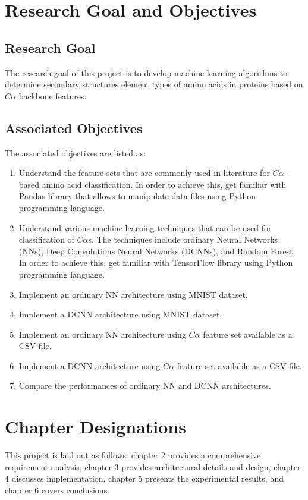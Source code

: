 \documentclass[12pt,letterpaper,oneside,reqno]{book}
\theoremstyle{plain}
\theoremstyle{definition}
\theoremstyle{plain}
\theoremstyle{remark}
\theoremstyle{plain}
\theoremstyle{definition}
\theoremstyle{plain}
\begin{document}
\section{Research Goal and Objectives}
\subsection{Research Goal}
The research goal of this project is to develop machine learning algorithms to determine secondary structures element types of amino acids in proteins based on $C\alpha$ backbone features.

\subsection{Associated Objectives}
The associated objectives are listed as:

\begin{enumerate}
    \item Understand the feature sets that are commonly used in literature for $C\alpha$-based amino acid classification. In order to achieve this, get familiar with Pandas library that allows to manipulate data files using Python programming language.
    \item Understand various machine learning techniques that can be used for classification of $C\alpha$s. The techniques include ordinary Neural Networks (NNs), Deep Convolutions Neural Networks (DCNNs), and Random Forest. In order to achieve this, get familiar with TensorFlow library using Python programming language.
    \item Implement an ordinary NN architecture using MNIST dataset.
    \item Implement a DCNN architecture using MNIST dataset.
    \item Implement an ordinary NN architecture using $C\alpha$ feature set available as a CSV file.
    \item Implement a DCNN architecture using $C\alpha$ feature set available as a CSV file.
    \item Compare the performances of ordinary NN and DCNN architectures. 
\end{enumerate}
\section{Chapter Designations}
This project is laid out as follows: chapter 2 provides a comprehensive requirement analysis, chapter 3 provides architectural details and design, chapter 4 discusses implementation, chapter 5 presents the experimental results, and chapter 6 covers conclusions.
\end{document}
